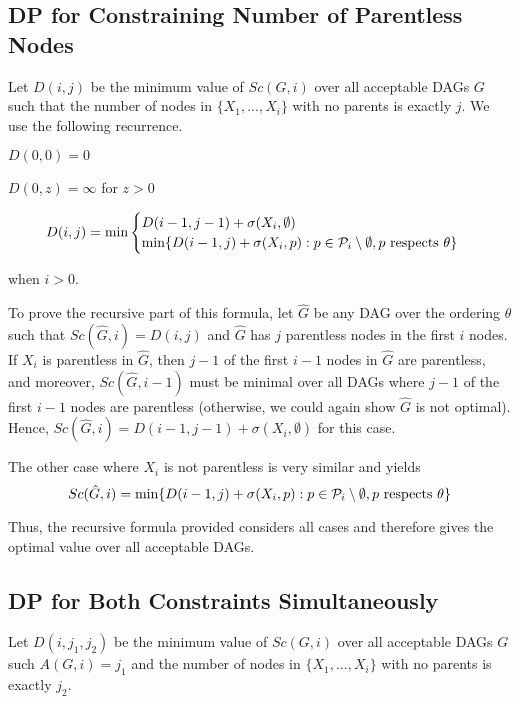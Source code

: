 \documentclass[twoside,11pt]{article}
\begin{document}
\subsection{DP for Constraining Number of Parentless Nodes}

Let $D(i, j)$ be the minimum value of $Sc(G, i)$ over all acceptable DAGs $G$ such that the number of nodes in $\{X_1,..., X_i\}$ with no parents is exactly $j$. 
We use the following recurrence. 

\bigskip{}
$D(0,0) = 0$

$D(0, z) = \infty$ for $z > 0$

\begin{equation}
    D(i, j) = \text{min}
    \begin{cases}
      D(i-1, j-1) + \sigma(X_i, \emptyset)\\
      \text{min} \{ D(i-1, j) + \sigma(X_i, p) : p \in \mathcal{P}_i \setminus \emptyset, \text{$ p$ respects }\theta \}
    \end{cases}
  \end{equation}
 
when $i > 0$. 

\bigskip{}
 To prove the recursive part of this formula, let $\hat{G}$ be any DAG over the ordering $\theta$ such that $Sc(\hat{G}, i) = D(i, j)$ and $\hat{G}$ has $j$ parentless nodes in the first $i$ nodes. If $X_i$ is parentless in $\hat{G}$, then $j-1$ of the first $i-1$ nodes in $\hat{G}$ are parentless, and moreover, $Sc(\hat{G}, i-1)$ must be minimal over all DAGs where $j-1$ of the first $i-1$ nodes are parentless (otherwise, we could again show $\hat{G}$ is not optimal). Hence, $Sc(\hat{G}, i) = D(i-1, j-1) + \sigma(X_i, \emptyset)$ for this case. 
 
 \bigskip{}
 The other case where $X_i$ is not parentless is very similar and yields $$Sc(\hat{G}, i) = \text{min} \{ D(i-1, j) + \sigma(X_i, p) : p \in \mathcal{P}_i \setminus \emptyset, \text{$ p$ respects }\theta \}$$
 
 Thus, the recursive formula provided considers all cases and therefore gives the optimal value over all acceptable DAGs. 


\subsection{DP for Both Constraints Simultaneously}

Let $D(i, j_1, j_2)$ be the minimum value of $Sc(G, i)$ over all acceptable DAGs $G$ such $A(G, i) = j_1$ and the number of nodes in $\{X_1,..., X_i\}$ with no parents is exactly
 $j_2$. 
 
\end{document}
